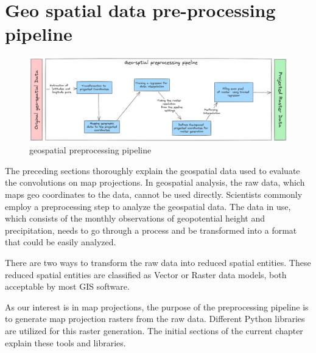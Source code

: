 
\clearpage
\cleardoublepage

\chapter{Geo spatial data pre-processing pipeline}
\begin{figure}[h]
    \centering
    \includegraphics[width=1.0\linewidth]{figures/chapter-7/preprocessing_pipeline.png}
    \caption{geospatial preprocessing pipeline}
    \label{fig:preprocessingpipeline}
\end{figure}
The preceding sections thoroughly explain the geospatial data used to evaluate the convolutions on map projections. In geospatial analysis, the raw data, which maps geo coordinates to the data, cannot be used directly. Scientists commonly employ a preprocessing step to analyze the geospatial data. The data in use, which consists of the monthly observations of geopotential height and precipitation, needs to go through a process and be transformed into a format that could be easily analyzed.

There are two ways to transform the raw data into reduced spatial entities. These reduced spatial entities are classified as Vector or Raster data models, both acceptable by most GIS software.

As our interest is in map projections, the purpose of the preprocessing pipeline is to generate map projection rasters from the raw data. Different Python libraries are utilized for this raster generation. The initial sections of the current chapter explain these tools and libraries.

